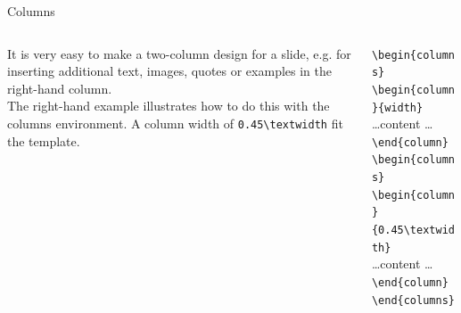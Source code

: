 \documentclass[aspectratio=169]{beamer}
\begin{document}
\begin{frame}[fragile]{Columns}
\begin{columns}
\begin{column}{0.45\textwidth}
   It is very easy to make a two-column design for a slide, e.g. for inserting additional text, images, quotes or examples in the right-hand column.\\
   \vspace{1em}
   The right-hand example illustrates how to do this with the columns environment. A column width of \verb=0.45\textwidth= fit the template.
\end{column}
\begin{column}{0.45\textwidth}
    \verb=\begin{columns}=\\
        \hspace{1em}\verb=\begin{column}{width}=\\
        \hspace{2em}\dots content \dots\\
        \hspace{1em}\verb=\end{column}=
        \hspace{1em}\verb=\begin{columns}=\\
        \hspace{1em}\verb=\begin{column}{0.45\textwidth}=\\
        \hspace{2em}\dots content \dots\\
        \hspace{1em}\verb=\end{column}=\\
    \verb=\end{columns}=
\end{column}
\end{columns}
\end{frame}
\end{document}
